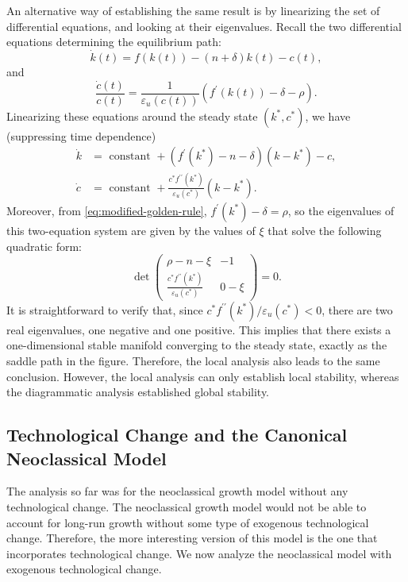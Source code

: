 \documentclass[\topdir/lecture\_notes.tex]{subfiles}
\begin{document}
An alternative way of establishing the same result is by linearizing the set of differential equations, and looking at their eigenvalues. Recall the two differential equations determining the equilibrium path:
\[
  \dot{k}(t)=f(k(t))-(n+\delta) k(t)-c(t),
\]
and
\[
  \frac{\dot{c}(t)}{c(t)}=\frac{1}{\varepsilon_{u}(c(t))}\left(f^{\prime}(k(t))-\delta-\rho\right).
\]
Linearizing these equations around the steady state \(\left(k^{*}, c^{*}\right)\), we have (suppressing time dependence)
\[
  \begin{aligned}
    \dot{k} & =\text { constant }+\left(f^{\prime}\left(k^{*}\right)-n-\delta\right)\left(k-k^{*}\right)-c,                                \\
    \dot{c} & =\text { constant }+\frac{c^{*} f^{\prime \prime}\left(k^{*}\right)}{\varepsilon_{u}\left(c^{*}\right)}\left(k-k^{*}\right).
  \end{aligned}
\]
Moreover, from \eqref{eq:modified-golden-rule}, \(f^{\prime}\left(k^{*}\right)-\delta=\rho\), so the eigenvalues of this two-equation system are given by the values of \(\xi\) that solve the following quadratic form:
\[
  \operatorname{\det}\left(\begin{array}{cc}
      \rho-n-\xi                                                                          & -1    \\
      \frac{c^{*} f^{\prime \prime}\left(k^{*}\right)}{\varepsilon_{u}\left(c^{*}\right)} & 0-\xi
    \end{array}\right)=0.
\]
It is straightforward to verify that, since \(c^{*} f^{\prime \prime}\left(k^{*}\right) / \varepsilon_{u}\left(c^{*}\right)<0\), there are two real eigenvalues, one negative and one positive. This implies that there exists a one-dimensional stable manifold converging to the steady state, exactly as the saddle path in the figure. Therefore, the local analysis also leads to the same conclusion. However, the local analysis can only establish local stability, whereas the diagrammatic analysis established global stability.

\subsection{Technological Change and the Canonical Neoclassical Model}
The analysis so far was for the neoclassical growth model without any technological change.
The neoclassical growth model would not be able to account for long-run growth without some type of exogenous technological change.
Therefore, the more interesting version of this model is the one that incorporates technological change.
We now analyze the neoclassical model with exogenous technological change.
\end{document}
